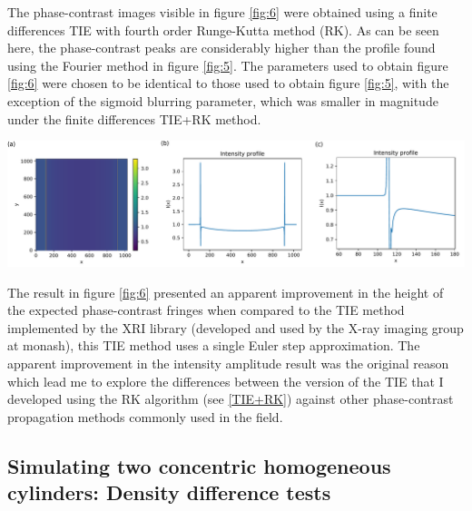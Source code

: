 \documentclass[10pt, a4paper, singlespacing]{report}
\newenvironment{Figure}
    {\par\medskip\noindent\minipage{\linewidth}}
    {\endminipage\par\medskip}
\begin{document}
The phase-contrast images visible in figure \ref{fig:6} were obtained using a finite differences TIE with fourth order Runge-Kutta method (RK). As can be seen here, the phase-contrast peaks are considerably higher than the profile found using the Fourier method in figure \ref{fig:5}. The parameters used to obtain figure \ref{fig:6} were chosen to be identical to those used to obtain figure \ref{fig:5}, with the exception of the sigmoid blurring parameter, which was smaller in magnitude under the finite differences TIE+RK method.
\begin{Figure} 
\centering
\includegraphics[width=\linewidth]{FD_intensity_profile.pdf}
\label{fig:6} 
\end{Figure}
The result in figure \ref{fig:6} presented an apparent improvement in the height of the expected phase-contrast fringes when compared to the TIE method implemented by the XRI library (developed and used by the X-ray imaging group at monash), this TIE method uses a single Euler step approximation. The apparent improvement in the intensity amplitude result was the original reason which lead me to explore the differences between the version of the TIE that I developed using the RK algorithm (see \ref{TIE+RK}) against other phase-contrast propagation methods commonly used in the field.

\subsection{Simulating two concentric homogeneous cylinders: Density difference tests}
\end{document}
